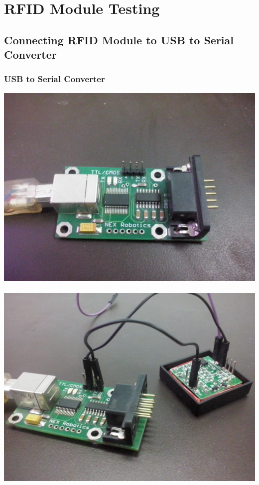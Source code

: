 \documentclass[table,10pt,red]{beamer}	%
\begin{document}
\section{RFID Module Testing} %

\subsection{Connecting RFID Module to USB to Serial Converter} %
\begin{frame}
	\frametitle{USB to Serial Converter}
	\begin{minipage}[c]{0.2\textwidth}
				\includegraphics[width=\linewidth]{usb1}\\\\
				\includegraphics[width=\linewidth]{usb2}\\\\

\end{minipage}
\end{frame}
\end{document}
